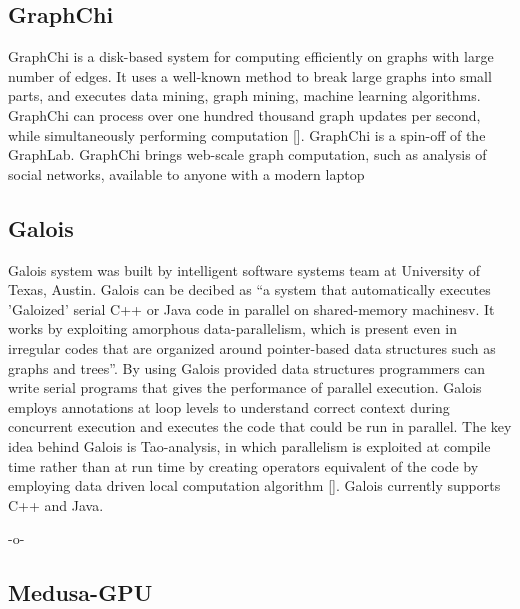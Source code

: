 \subsection{GraphChi}

GraphChi is a disk-based system for computing efficiently on graphs
with large number of edges.  It uses a well-known method to break
large graphs into small parts, and executes data mining, graph mining,
machine learning algorithms. GraphChi can process over one hundred
thousand graph updates per second, while simultaneously performing
computation [\cite{GraphChi}]. GraphChi is a spin-off of the
GraphLab. GraphChi brings web-scale graph computation, such as
analysis of social networks, available to anyone with a modern laptop

     
\subsection{Galois}
     
Galois system was built by intelligent software systems team at
University of Texas, Austin. Galois can be decibed as ``a system that
automatically executes 'Galoized' serial C++ or Java code in
parallel on shared-memory machinesv\cite{www-galoisSite}. It works by
exploiting amorphous data-parallelism, which is present even in
irregular codes that are organized around pointer-based data
structures such as graphs and trees''. By using Galois provided data
structures programmers can write serial programs that gives the
performance of parallel execution. Galois employs annotations at loop
levels to understand correct context during concurrent execution and
executes the code that could be run in parallel. The key idea behind
Galois is Tao-analysis, in which parallelism is exploited at compile
time rather than at run time by creating operators equivalent of the
code by employing data driven local computation
algorithm [\cite{taoParallelismPaper}]. Galois currently supports C++
and Java.

     -o-
     
\subsection{Medusa-GPU}
     
